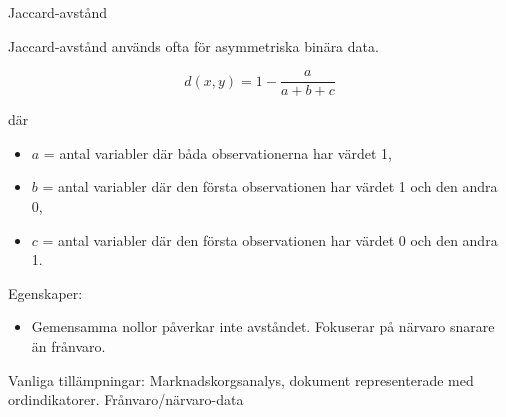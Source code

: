 \documentclass[10pt,english]{beamer}
\begin{document}
\begin{frame}{Jaccard-avstånd}

    Jaccard-avstånd används ofta för asymmetriska binära data.

    \[
        d(x,y)
        =
        1-
        \frac{a}{a+b+c}
    \]

där

\begin{itemize}
    \item $a$ = antal variabler där båda observationerna har värdet 1,
    \item $b$ = antal variabler där den första observationen har värdet 1 och den andra 0,
    \item $c$ = antal variabler där den första observationen har värdet 0 och den andra 1.
\end{itemize}

    Egenskaper:

    \begin{itemize}
        \item Gemensamma nollor påverkar inte avståndet. Fokuserar på närvaro snarare än frånvaro.
    \end{itemize}

    Vanliga tillämpningar: Marknadskorgsanalys, dokument representerade med ordindikatorer. Frånvaro/närvaro-data


\end{frame}
\end{document}
